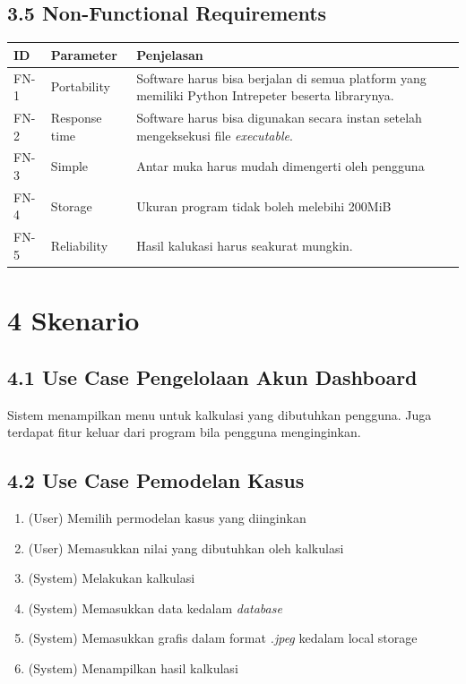 \documentclass[a4paper]{article}
\begin{document}
    \subsection*{3.5 Non-Functional Requirements}
    \begin{tabular}{ | m{3em}| m{} | m{} | }
        \hline
        \textbf{ID} & \textbf{Parameter} & \textbf{Penjelasan}\\
        \hline
        FN-1
        &
        Portability
        &
        Software harus bisa berjalan di semua platform yang 
        memiliki Python Intrepeter beserta librarynya.
        \\
        \hline
        FN-2
        &
        Response time
        &
        Software harus bisa digunakan secara instan setelah
        mengeksekusi file \textit{executable}.
        \\
        \hline
        FN-3
        &
        Simple 
        &
        Antar muka harus mudah dimengerti oleh pengguna
        \\
        \hline
        FN-4
        &
        Storage
        &
        Ukuran program tidak boleh melebihi 200MiB
        \\
        \hline
        FN-5
        &
        Reliability 
        &
        Hasil kalukasi harus seakurat mungkin.
        \\
        \hline
    \end{tabular}
\section*{4 Skenario}
    \subsection*{4.1 Use Case Pengelolaan Akun Dashboard}
    \noindent Sistem menampilkan menu untuk kalkulasi yang dibutuhkan pengguna. 
    Juga terdapat fitur keluar dari program bila pengguna menginginkan.
    \subsection*{4.2 Use Case Pemodelan Kasus}
    \begin{enumerate}
        \item (User) Memilih permodelan kasus yang diinginkan
        \item (User) Memasukkan nilai yang dibutuhkan oleh kalkulasi
        \item (System) Melakukan kalkulasi
        \item (System) Memasukkan data kedalam \textit{database}
        \item (System) Memasukkan grafis dalam format \textit{.jpeg} kedalam local storage
        \item (System) Menampilkan hasil kalkulasi
    \end{enumerate}
\end{document}
